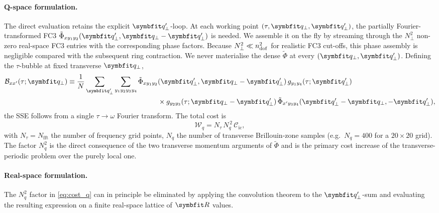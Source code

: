 \paragraph{Q-space formulation.} The direct evaluation retains the
explicit $\qp'$-loop. At each working point $(\tau,\qp,\qp')$, the
partially Fourier-transformed FC3 $\tilde\Phi_{xy_1y_2}(\qp',\qp-\qp')$
is needed. We assemble it on the fly by streaming through the
$N_\perp^{2}$ non-zero real-space FC3 entries with the corresponding
phase factors. Because $N_\perp^{2} \ll n_{\mathrm{dof}}^{2}$ for realistic
FC3 cut-offs, this phase assembly is negligible compared with the
subsequent ring contraction. We never materialise the dense
$\tilde\Phi$ at every $(\qp,\qp')$. Defining the $\tau$-bubble at
fixed transverse $\qp$,
\begin{equation}\label{eq:bubble_q}
\begin{aligned}
  \mathcal{B}_{xx'}(\tau;\qp)
  \equiv \frac{1}{N}\sum_{\qp'}
    \sum_{y_1y_2y_3y_4}
    \tilde\Phi_{xy_1y_2}&(\qp',\qp-\qp')\,
    g_{y_1y_4}(\tau;\qp')\,\\
    &\times g_{y_2y_3}(\tau;\qp-\qp')\,
    \tilde\Phi_{x'y_3y_4}(\qp'-\qp,-\qp'),
\end{aligned}
\end{equation}
the SSE follows from a single $\tau\to\omega$ Fourier transform.
The total cost is
\begin{equation}\label{eq:cost_q}
  \mathcal{W}_q = N_\tau\,N_q^{\,2}\,\mathcal{C}_\mathrm{ic},
\end{equation}
with $N_\tau = N_\mathrm{fft}$ the number of frequency grid points,
$N_q$ the number of transverse Brillouin-zone samples (e.g.\
$N_q=400$ for a $20\times 20$ grid). The factor $N_q^{2}$
is the direct consequence of the two transverse momentum arguments
of $\tilde\Phi$ and is the primary cost increase of the
transverse-periodic problem over the purely local one.

\paragraph{Real-space formulation.} The $N_q^{2}$ factor in
\cref{eq:cost_q} can in principle be eliminated by applying the
convolution theorem to the $\qp'$-sum and evaluating the resulting
expression on a finite real-space lattice of $\vR$ values.

